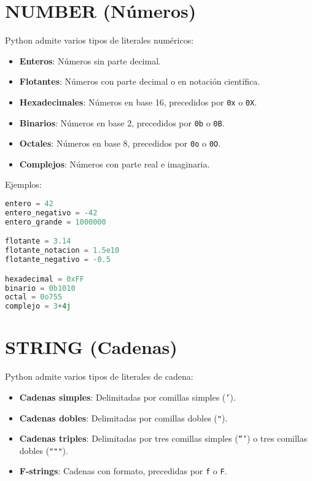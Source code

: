 \documentclass[12pt,letterpaper]{report}
\begin{document}
\section{NUMBER (Números)}

Python admite varios tipos de literales numéricos:

\begin{itemize}
    \item \textbf{Enteros}: Números sin parte decimal.
    \item \textbf{Flotantes}: Números con parte decimal o en notación científica.
    \item \textbf{Hexadecimales}: Números en base 16, precedidos por \texttt{0x} o \texttt{0X}.
    \item \textbf{Binarios}: Números en base 2, precedidos por \texttt{0b} o \texttt{0B}.
    \item \textbf{Octales}: Números en base 8, precedidos por \texttt{0o} o \texttt{0O}.
    \item \textbf{Complejos}: Números con parte real e imaginaria.
\end{itemize}

Ejemplos:
\begin{lstlisting}[language=Python]
entero = 42
entero_negativo = -42
entero_grande = 1000000

flotante = 3.14
flotante_notacion = 1.5e10
flotante_negativo = -0.5

hexadecimal = 0xFF
binario = 0b1010
octal = 0o755
complejo = 3+4j
\end{lstlisting}

\section{STRING (Cadenas)}

Python admite varios tipos de literales de cadena:

\begin{itemize}
    \item \textbf{Cadenas simples}: Delimitadas por comillas simples (\texttt{'}).
    \item \textbf{Cadenas dobles}: Delimitadas por comillas dobles (\texttt{"}).
    \item \textbf{Cadenas triples}: Delimitadas por tres comillas simples (\texttt{'''}) o tres comillas dobles (\texttt{"""}).
    \item \textbf{F-strings}: Cadenas con formato, precedidas por \texttt{f} o \texttt{F}.
\end{itemize}
\end{document}
